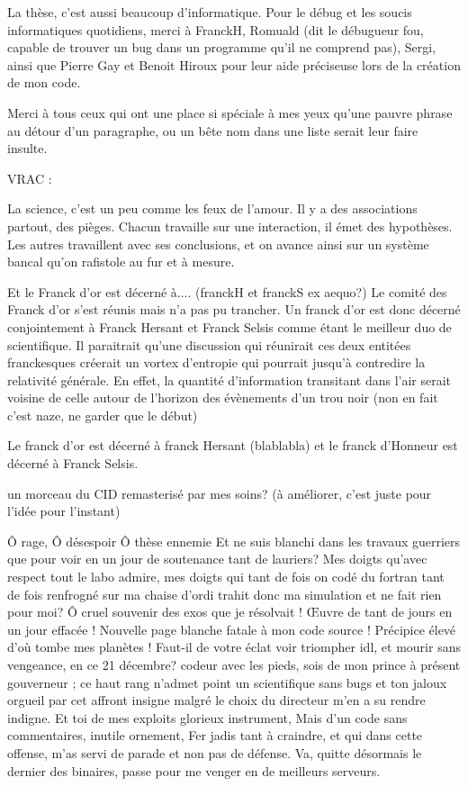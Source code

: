 La thèse, c'est aussi beaucoup d'informatique. Pour le débug et les soucis informatiques quotidiens, merci à FranckH, Romuald (dit le débugueur fou, capable de trouver un bug dans un programme qu'il ne comprend pas), Sergi, ainsi que Pierre Gay et Benoit Hiroux pour leur aide préciseuse lors de la création de mon code. 



Merci à tous ceux qui ont une place si spéciale à mes yeux qu'une pauvre phrase au détour d'un paragraphe, ou un bête nom dans une liste serait leur faire insulte. 


VRAC : 

La science, c'est un peu comme les feux de l'amour. Il y a des associations partout, des pièges. Chacun travaille sur une interaction, il émet des hypothèses. Les autres travaillent avec ses conclusions, et on avance ainsi sur un système bancal qu'on rafistole au fur et à mesure.

Et le Franck d'or est décerné à.... (franckH et franckS ex aequo?)
Le comité des Franck d'or s'est réunis mais n'a pas pu trancher. Un franck d'or est donc décerné conjointement à Franck Hersant et Franck Selsis comme étant le meilleur duo de scientifique. Il paraitrait qu'une discussion qui réunirait ces deux entitées franckesques créerait un vortex d'entropie qui pourrait jusqu'à contredire la relativité générale. En effet, la quantité d'information transitant dans l'air serait voisine de celle autour de l'horizon des évènements d'un trou noir (non en fait c'est naze, ne garder que le début)

Le franck d'or est décerné à franck Hersant (blablabla) et le franck d'Honneur est décerné à Franck Selsis.

un morceau du CID remasterisé par mes soins? (à améliorer, c'est juste pour l'idée pour l'instant)


Ô rage, Ô désespoir Ô thèse ennemie
Et ne suis blanchi dans les travaux guerriers
que pour voir en un jour de soutenance tant de lauriers? 
Mes doigts qu'avec respect tout le labo admire, 
mes doigts qui tant de fois on codé du fortran
tant de fois renfrogné sur ma chaise d'ordi
trahit donc ma simulation et ne fait rien pour moi? 
Ô cruel souvenir des exos que je résolvait !
Œuvre de tant de jours en un jour effacée !
Nouvelle page blanche fatale à mon code source !
Précipice élevé d'où tombe mes planètes !
Faut-il de votre éclat voir triompher idl, 
et mourir sans vengeance, en ce 21 décembre? 
codeur avec les pieds, sois de mon prince à présent gouverneur ; 
ce haut rang n'admet point un scientifique sans bugs
et ton jaloux orgueil par cet affront insigne
malgré le choix du directeur m'en a su rendre indigne. 
Et toi de mes exploits glorieux instrument, 
Mais d'un code sans commentaires, inutile ornement, 
Fer jadis tant à craindre, et qui dans cette offense, 
m'as servi de parade et non pas de défense. 
Va, quitte désormais le dernier des binaires,
passe pour me venger en de meilleurs serveurs.